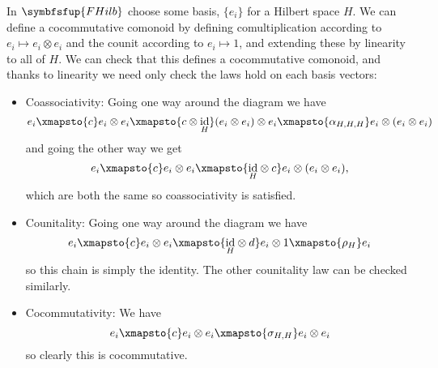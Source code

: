 \documentclass[fleqn]{NotesClass}
\makeatletter
\newcommand{\c@egory}[1]{\symbfsfup{#1}}
\newcommand{\FHilb}{\c@egory{FHilb}}
\DeclareMathOperator{\id}{id}
\makeatother
\begin{document}
    In \(\FHilb\) choose some basis, \(\{e_i\}\) for a Hilbert space \(H\).
    We can define a cocommutative comonoid by defining comultiplication according to \(e_i \mapsto e_i \otimes e_i\) and the counit according to \(e_i \mapsto 1\), and extending these by linearity to all of \(H\).
    We can check that this defines a cocommutative comonoid, and thanks to linearity we need only check the laws hold on each basis vectors:
    \begin{itemize}
        \item Coassociativity: Going one way around the diagram we have
        \begin{equation}
            e_i \xmapsto{c} e_i \otimes e_i \xmapsto{c \otimes \id_H} (e_i \otimes e_i) \otimes e_i \xmapsto{\alpha_{H,H,H}} e_i \otimes (e_i \otimes e_i)
        \end{equation}
        and going the other way we get
        \begin{equation}
            e_i \xmapsto{c} e_i \otimes e_i \xmapsto{{\id_H} \otimes c} e_i \otimes (e_i \otimes e_i),
        \end{equation}
        which are both the same so coassociativity is satisfied.
        \item Counitality: Going one way around the diagram we have
        \begin{equation}
            e_i \xmapsto{c} e_i \otimes e_i \xmapsto{{\id_H} \otimes d} e_i \otimes 1 \xmapsto{\rho_H} e_i
        \end{equation}
        so this chain is simply the identity.
        The other counitality law can be checked similarly.
        \item Cocommutativity: We have
        \begin{equation}
            e_i \xmapsto{c} e_i \otimes e_i \xmapsto{\sigma_{H,H}} e_i \otimes e_i
        \end{equation}
        so clearly this is cocommutative.
    \end{itemize}
    
    
    
    
    
    \appendixpage
    \begin{appendices}
        
    \end{appendices}
    
    \backmatter
    \printbibliography
    \printindex
\end{document}
